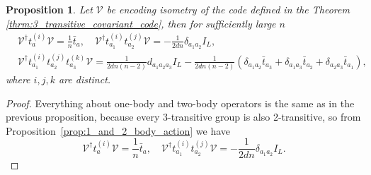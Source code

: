 \documentclass[10pt,twocolumn,superscriptaddress,aps,amsmath,amssymb,citeautoscript,floatfix,prx]{revtex4-2}
\theoremstyle{plain}
\theoremstyle{plain}
\theoremstyle{plain}
\theoremstyle{plain}
\theoremstyle{plain}
\theoremstyle{plain}
\theoremstyle{plain}
\newtheorem{smproposition}[smtheorem]{Proposition}
\theoremstyle{definition}
\theoremstyle{plain}
\begin{document}
\begin{appendix}
\begin{smproposition}\label{prop:1_2_and_3_body_action}
    Let $\mathcal{V}$ be encoding isometry of the code defined in the Theorem \ref{thrm:3_transitive_covariant_code}, then for sufficiently large $n$
    \begin{align}
    &\mathcal{V}^{\dagger} t^{(i)}_a \mathcal{V}=\frac{1}{n} \bar{t}_a, \quad \mathcal{V}^{\dagger} t_{a_1}^{(i)} t_{a_2}^{(j)} \mathcal{V}=-\frac{1}{2 d n} \delta_{a_1 a_2} I_L, \\ &\mathcal{V}^{\dagger} t_{a_1}^{(i)} t_{a_2}^{(j)} t_{a_3}^{(k)} \mathcal{V}
    =\frac{1}{2 dn(n-2)} d_{a_1 a_2 a_3} I_L-\frac{1}{2 dn(n-2)}\left(\delta_{a_1 a_2} \bar{t}_{a_3}+\delta_{a_1 a_3} \bar{t}_{a_2}+\delta_{a_2 a_3} \bar{t}_{a_1}\right),
    \end{align}
    where $i, j, k$ are distinct.
\end{smproposition}

\begin{proof}
    Everything about one-body and two-body operators is the same as in the previous proposition, 
    because every 3-transitive group is also 2-transitive, so from Proposition~\ref{prop:1_and_2_body_action} we have
    \begin{equation}\label{eq:VtaV_and_Vta_tbV}
        \mathcal{V}^{\dagger} t^{(i)}_a \mathcal{V}=\frac{1}{n} \bar{t}_a, \quad \mathcal{V}^{\dagger} t_{a_1}^{(i)} t_{a_2}^{(j)} \mathcal{V}=-\frac{1}{2 d n} \delta_{a_1 a_2} I_L.
    \end{equation}


\end{proof}
\end{appendix}
\end{document}
